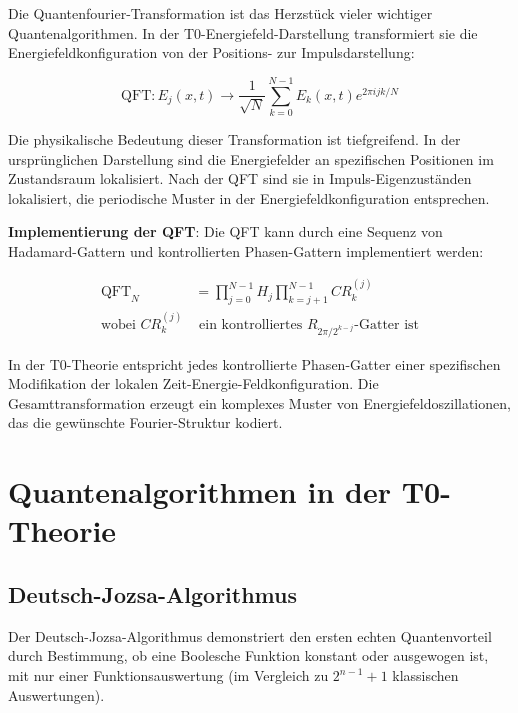 \documentclass[12pt,a4paper]{article}
\theoremstyle{definition}
\theoremstyle{remark}
\begin{document}
Die Quantenfourier-Transformation ist das Herzst{\"u}ck vieler wichtiger Quantenalgorithmen. In der T0-Energiefeld-Darstellung transformiert sie die Energiefeldkonfiguration von der Positions- zur Impulsdarstellung:

\begin{equation}
	\text{QFT}: E_j(x,t) \rightarrow \frac{1}{\sqrt{N}} \sum_{k=0}^{N-1} E_k(x,t) e^{2\pi i jk/N}
	\label{eq:qft_detailed}
\end{equation}

Die physikalische Bedeutung dieser Transformation ist tiefgreifend. In der urspr{\"u}nglichen Darstellung sind die Energiefelder an spezifischen Positionen im Zustandsraum lokalisiert. Nach der QFT sind sie in Impuls-Eigenzust{\"a}nden lokalisiert, die periodische Muster in der Energiefeldkonfiguration entsprechen.

\textbf{Implementierung der QFT}:
Die QFT kann durch eine Sequenz von Hadamard-Gattern und kontrollierten Phasen-Gattern implementiert werden:

\begin{align}
	\text{QFT}_N &= \prod_{j=0}^{N-1} H_j \prod_{k=j+1}^{N-1} CR_k^{(j)} \\
	\text{wobei } CR_k^{(j)} &\text{ ein kontrolliertes } R_{2\pi/2^{k-j}} \text{-Gatter ist}
\end{align}

In der T0-Theorie entspricht jedes kontrollierte Phasen-Gatter einer spezifischen Modifikation der lokalen Zeit-Energie-Feldkonfiguration. Die Gesamttransformation erzeugt ein komplexes Muster von Energiefeldoszillationen, das die gew{\"u}nschte Fourier-Struktur kodiert.

\section{Quantenalgorithmen in der T0-Theorie}

\subsection{Deutsch-Jozsa-Algorithmus}

Der Deutsch-Jozsa-Algorithmus demonstriert den ersten echten Quantenvorteil durch Bestimmung, ob eine Boolesche Funktion konstant oder ausgewogen ist, mit nur einer Funktionsauswertung (im Vergleich zu $2^{n-1}+1$ klassischen Auswertungen).
\end{document}
